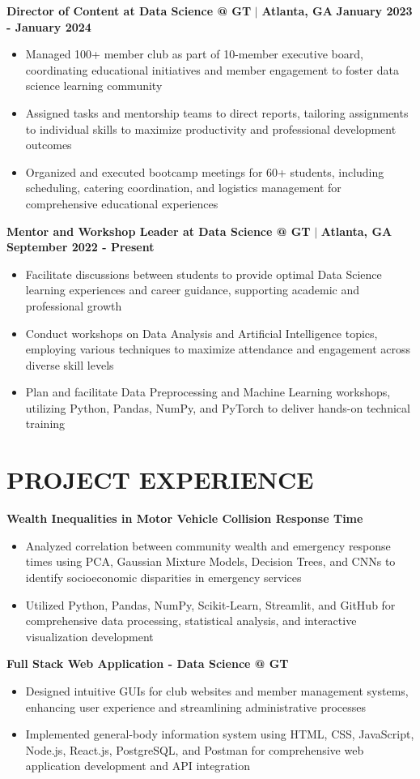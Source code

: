 \documentclass[10pt,a4paper]{article}
\newcommand{\jobtitle}[1]{\noindent\textbf{#1}}
\begin{document}
\jobtitle{Director of Content at Data Science @ GT} $|$ \textbf{Atlanta, GA} \hfill \textbf{January 2023 - January 2024}
\begin{itemize}
    \item Managed 100+ member club as part of 10-member executive board, coordinating educational initiatives and member engagement to foster data science learning community
    \item Assigned tasks and mentorship teams to direct reports, tailoring assignments to individual skills to maximize productivity and professional development outcomes
    \item Organized and executed bootcamp meetings for 60+ students, including scheduling, catering coordination, and logistics management for comprehensive educational experiences
\end{itemize}

\jobtitle{Mentor and Workshop Leader at Data Science @ GT} $|$ \textbf{Atlanta, GA} \hfill \textbf{September 2022 - Present}
\begin{itemize}
    \item Facilitate discussions between students to provide optimal Data Science learning experiences and career guidance, supporting academic and professional growth
    \item Conduct workshops on Data Analysis and Artificial Intelligence topics, employing various techniques to maximize attendance and engagement across diverse skill levels
    \item Plan and facilitate Data Preprocessing and Machine Learning workshops, utilizing Python, Pandas, NumPy, and PyTorch to deliver hands-on technical training
\end{itemize}

\section*{PROJECT EXPERIENCE}
\jobtitle{Wealth Inequalities in Motor Vehicle Collision Response Time}
\begin{itemize}
    \item Analyzed correlation between community wealth and emergency response times using PCA, Gaussian Mixture Models, Decision Trees, and CNNs to identify socioeconomic disparities in emergency services
    \item Utilized Python, Pandas, NumPy, Scikit-Learn, Streamlit, and GitHub for comprehensive data processing, statistical analysis, and interactive visualization development
\end{itemize}

\jobtitle{Full Stack Web Application - Data Science @ GT}
\begin{itemize}
    \item Designed intuitive GUIs for club websites and member management systems, enhancing user experience and streamlining administrative processes
    \item Implemented general-body information system using HTML, CSS, JavaScript, Node.js, React.js, PostgreSQL, and Postman for comprehensive web application development and API integration
\end{itemize}
\end{document}
